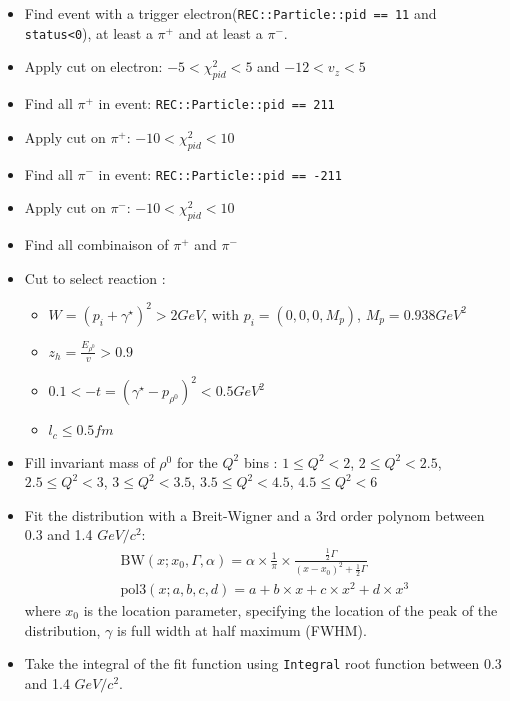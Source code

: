 \documentclass{report}
\begin{document}
    \begin{itemize}
        \item Find event with a trigger electron(\texttt{REC::Particle::pid == 11} and \texttt{status<0}), at least a \(\pi^+\) and at least a \(\pi^-\).
        \item Apply cut on electron: \(-5 < \chi^2_{pid} < 5\) and \(-12 < v_z < 5\)
        \item Find all \(\pi^+\) in event: \texttt{REC::Particle::pid == 211}
        \item Apply cut on \(\pi^+\): \(-10 < \chi^2_{pid} < 10\) 
        \item Find all \(\pi^-\) in event: \texttt{REC::Particle::pid == -211}
        \item Apply cut on \(\pi^-\): \(-10 < \chi^2_{pid} < 10\)
        \item Find all combinaison of \(\pi^+\) and \(\pi^-\)
        \item Cut to select reaction : 
        \begin{itemize}
            \item \(W = (p_i + \gamma^{\star})^2 > 2GeV\), with \(p_i = (0,0,0,M_p)\), \(M_p = 0.938 GeV^2\)
            \item \(z_h = \frac{E_{\rho^0}}{v}> 0.9\)
            \item \( 0.1 < -t = (\gamma^{\star} - p_{\rho^0})^2 < 0.5 GeV^2\)
            \item \(l_c \le 0.5 fm\)
        \end{itemize}
        \item Fill invariant mass of \(\rho^0\) for the \(Q^2\) bins : \(1 \le Q^2 < 2\), \(2 \le Q^2 < 2.5\), \(2.5 \le Q^2 < 3\), \(3 \le Q^2 < 3.5\), \(3.5 \le Q^2 < 4.5\), \(4.5 \le Q^2 < 6\)
        \item Fit the distribution with a Breit-Wigner and a 3rd order polynom between 0.3 and 1.4 \(GeV/c^2\): 
        \begin{align}
            \text{BW}(x;x_0,\Gamma,\alpha) = \alpha \times \frac{1}{\pi} \times \frac{\frac{1}{2}\Gamma}{(x-x_0)^2 + \frac{1}{2}\Gamma} \\
            \text{pol3}(x;a,b,c,d) = a + b \times x + c \times x^2 + d \times x^3
        \end{align}
        where \(x_{0}\) is the location parameter, specifying the location of the peak of the distribution, \(\gamma\) is full width at half maximum (FWHM).
        \item Take the integral of the fit function using \texttt{Integral} root function between 0.3 and 1.4 \(GeV/c^2\).
    \end{itemize}
\end{document}

